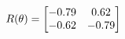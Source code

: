\documentclass[preview]{standalone}
\begin{document}
\begin{align*}
\special{dvisvgm:raw <g id='unique000'>}R(\theta) = \begin{bmatrix}-0.79 & 0.62\\-0.62 & -0.79\end{bmatrix}\special{dvisvgm:raw </g>}
\end{align*}
\end{document}
